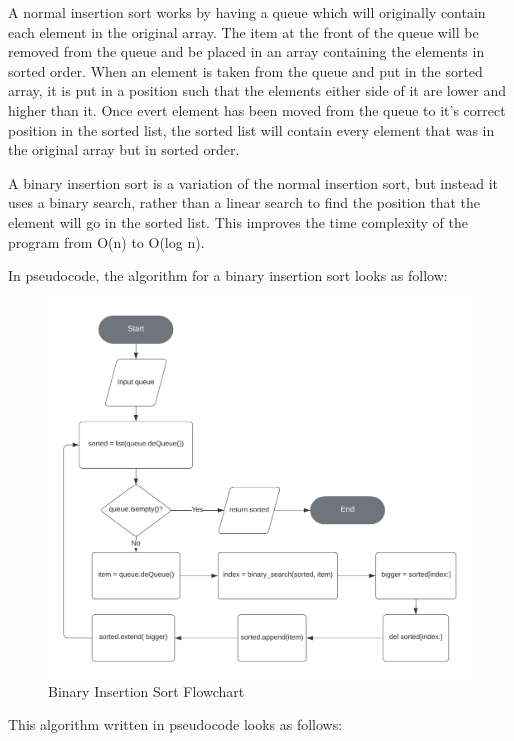 \documentclass{article}
\begin{document}
A normal insertion sort works by having a queue which will originally contain each element in the original array. The item at the front of the queue will be removed from the queue and be placed in an array containing the elements in sorted order. When an element is taken from the queue and put in the sorted array, it is put in a position such that the elements either side of it are lower and higher than it. Once evert element has been moved from the queue to it's correct position in the sorted list, the sorted list will contain every element that was in the original array but in sorted order.

A binary insertion sort is a variation of the normal insertion sort, but instead it uses a binary search, rather than a linear search to find the position that the element will go in the sorted list. This improves the time complexity of the program from O(n) to O(log n).

In pseudocode, the algorithm for a binary insertion sort looks as follow:

\begin{figure}[h]
    \centering
    \captionsetup{justification=centering}
    \includegraphics[scale=0.142]{binary-insertion-sort-flowchart}
    \caption{Binary Insertion Sort Flowchart}
\end{figure}

This algorithm written in pseudocode looks as follows:
\end{document}
